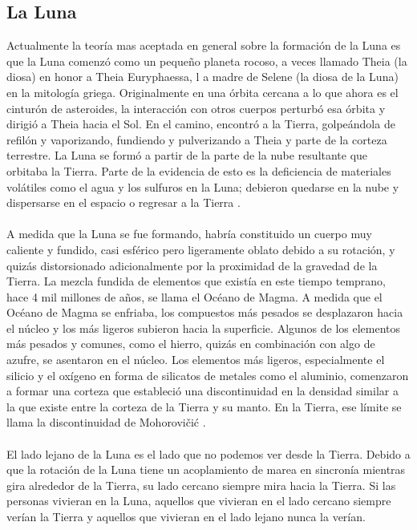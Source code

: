 \documentclass[12pt]{article}
\begin{document}
\subsection{La Luna}
Actualmente la teoría mas aceptada en general sobre la formación de la Luna es que la Luna comenzó 
como un pequeño planeta rocoso, a veces llamado Theia (la diosa) en honor a Theia Euryphaessa, l
a madre de Selene (la diosa de la Luna) en la mitología griega. Originalmente en una órbita cercana 
a lo que ahora es el cinturón de asteroides, la interacción con otros cuerpos perturbó esa órbita y 
dirigió a Theia hacia el Sol. En el camino, encontró a la Tierra, golpeándola de refilón y vaporizando, 
fundiendo y pulverizando a Theia y parte de la corteza terrestre. La Luna se formó a partir de la parte 
de la nube resultante que orbitaba la Tierra. Parte de la evidencia de esto es la deficiencia de materiales 
volátiles como el agua y los sulfuros en la Luna; debieron quedarse en la nube y dispersarse en el espacio o 
regresar a la Tierra \parencite{byrne2008far}.\\
\\
A medida que la Luna se fue formando, habría constituido un cuerpo muy caliente y fundido, casi esférico 
pero ligeramente oblato debido a su rotación, y quizás distorsionado adicionalmente por la proximidad de la 
gravedad de la Tierra. La mezcla fundida de elementos que existía en este tiempo temprano, hace 4 mil millones 
de años, se llama el Océano de Magma. A medida que el Océano de Magma se enfriaba, los compuestos más pesados 
se desplazaron hacia el núcleo y los más ligeros subieron hacia la superficie. Algunos de los elementos 
más pesados y comunes, como el hierro, quizás en combinación con algo de azufre, se asentaron en el núcleo. 
Los elementos más ligeros, especialmente el silicio y el oxígeno en forma de silicatos de metales como el aluminio, 
comenzaron a formar una corteza que estableció una discontinuidad en la densidad similar a la que existe entre 
la corteza de la Tierra y su manto. En la Tierra, ese límite se llama la discontinuidad de Mohorovičić 
\parencite{Origin_of_the_moon}\parencite{byrne2008far}.\\
\\
El lado lejano de la Luna es el lado que no podemos ver desde la Tierra. Debido a que la rotación de 
la Luna tiene un acoplamiento de marea en sincronía mientras gira alrededor de la Tierra, su lado cercano siempre 
mira hacia la Tierra. Si las personas vivieran en la Luna, aquellos que vivieran en el lado cercano 
siempre verían la Tierra y aquellos que vivieran en el lado lejano nunca la verían.
\end{document}
